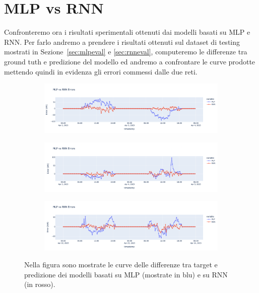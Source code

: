 \section{MLP vs RNN}
Confronteremo ora i risultati sperimentali ottenuti
dai modelli basati su MLP e RNN. Per farlo andremo a prendere i risultati
ottenuti sul dataset di testing mostrati in Sezione~\ref{sec:mlpeval} e \ref{sec:rnneval}, computeremo le differenze tra ground tuth e predizione
del modello ed andremo a confrontare le curve prodotte mettendo quindi in
evidenza gli errori commessi dalle due reti.

\begin{figure}[H]
	\centering
	\begin{subfigure}{\textwidth}
		\centering
		\includegraphics[width=.9\textwidth]{chapters/4_evaluation/imgs/mlpvsrnn/mlpvsrnn1.png}
		\caption{}
	\end{subfigure}
	\begin{subfigure}{\textwidth}
		\centering
		\includegraphics[width=.9\textwidth]{chapters/4_evaluation/imgs/mlpvsrnn/mlpvsrnn2.png}
		\caption{}
	\end{subfigure}
	\begin{subfigure}{\textwidth}
		\centering
		\includegraphics[width=.9\textwidth]{chapters/4_evaluation/imgs/mlpvsrnn/mlpvsrnn3.png}
		\caption{}
	\end{subfigure}
	\caption{Nella figura sono mostrate le curve delle differenze tra target e predizione dei modelli basati su MLP (mostrate in blu) e su RNN (in rosso).}
	\label{fig:mlpvsrnngrafici}
\end{figure}

